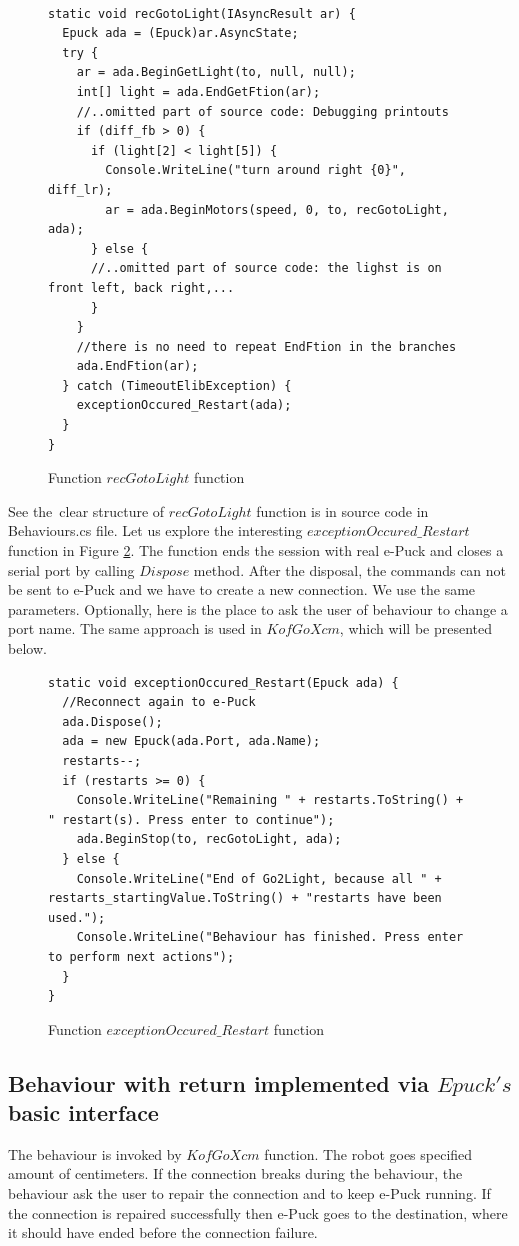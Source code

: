 \begin{figure}[!hbp]
\begin{lstlisting}
  
static void recGotoLight(IAsyncResult ar) {
  Epuck ada = (Epuck)ar.AsyncState;
  try {
    ar = ada.BeginGetLight(to, null, null);
    int[] light = ada.EndGetFtion(ar);
    //..omitted part of source code: Debugging printouts
    if (diff_fb > 0) {
      if (light[2] < light[5]) {
        Console.WriteLine("turn around right {0}", diff_lr);
        ar = ada.BeginMotors(speed, 0, to, recGotoLight, ada);
      } else {
      //..omitted part of source code: the lighst is on front left, back right,...
      }
    }
    //there is no need to repeat EndFtion in the branches
    ada.EndFtion(ar);
  } catch (TimeoutElibException) {
    exceptionOccured_Restart(ada);
  }
}
\end{lstlisting}
\caption{Function $recGotoLight$ function} \label{go2light}
\end{figure}
  See the~clear structure of $recGotoLight$ function is in source code in Behaviours.cs file. 
  Let us explore the interesting $exceptionOccured\_Restart$ function in Figure \ref{restart}.
  The function ends the session with real e-Puck and closes a serial port by calling $Dispose$ method.
  After the disposal, the commands can not be sent to e-Puck and we have to create a new connection. We use the same parameters.
  Optionally, here is the place to ask the user of behaviour to change a port name.
  The same approach is used in $KofGoXcm$, which will be presented below.
\begin{figure}[!hbp]
\begin{lstlisting}
static void exceptionOccured_Restart(Epuck ada) {
  //Reconnect again to e-Puck
  ada.Dispose();
  ada = new Epuck(ada.Port, ada.Name);
  restarts--;
  if (restarts >= 0) {
    Console.WriteLine("Remaining " + restarts.ToString() + " restart(s). Press enter to continue");
    ada.BeginStop(to, recGotoLight, ada);
  } else {
    Console.WriteLine("End of Go2Light, because all " + restarts_startingValue.ToString() + "restarts have been used.");
    Console.WriteLine("Behaviour has finished. Press enter to perform next actions");
  }
}
\end{lstlisting}
\caption{Function $exceptionOccured\_Restart$ function} \label{restart}
\end{figure}

\subsection{Behaviour with return implemented via $Epuck's$ basic interface}\label{sec:kofgoxcm}
  The behaviour is invoked by $KofGoXcm$ function. 
  The robot goes specified amount of centimeters. 
  If the connection breaks during the behaviour, 
  the behaviour ask the user to repair the connection and to keep e-Puck running. 
  If the connection is repaired successfully then e-Puck goes to the destination, 
  where it should have ended before the connection failure.

